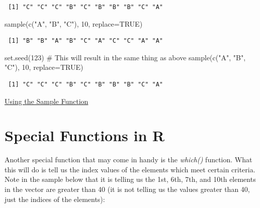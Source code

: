 \documentclass[
  letterpaper,
  DIV=11,
  numbers=noendperiod]{scrreprt}
\newenvironment{Shaded}{\begin{snugshade}}{\end{snugshade}}
\newcommand{\AttributeTok}[1]{\textcolor[rgb]{0.40,0.45,0.13}{#1}}
\newcommand{\CommentTok}[1]{\textcolor[rgb]{0.37,0.37,0.37}{#1}}
\newcommand{\ConstantTok}[1]{\textcolor[rgb]{0.56,0.35,0.01}{#1}}
\newcommand{\DecValTok}[1]{\textcolor[rgb]{0.68,0.00,0.00}{#1}}
\newcommand{\FunctionTok}[1]{\textcolor[rgb]{0.28,0.35,0.67}{#1}}
\newcommand{\NormalTok}[1]{\textcolor[rgb]{0.00,0.23,0.31}{#1}}
\newcommand{\StringTok}[1]{\textcolor[rgb]{0.13,0.47,0.30}{#1}}
\begin{document}
\begin{verbatim}
 [1] "C" "C" "C" "B" "C" "B" "B" "B" "C" "A"
\end{verbatim}

\begin{Shaded}
\begin{Highlighting}[]
\FunctionTok{sample}\NormalTok{(}\FunctionTok{c}\NormalTok{(}\StringTok{"A"}\NormalTok{, }\StringTok{"B"}\NormalTok{, }\StringTok{"C"}\NormalTok{), }\DecValTok{10}\NormalTok{, }\AttributeTok{replace=}\ConstantTok{TRUE}\NormalTok{)}
\end{Highlighting}
\end{Shaded}

\begin{verbatim}
 [1] "B" "B" "A" "B" "C" "A" "C" "C" "A" "A"
\end{verbatim}

\begin{Shaded}
\begin{Highlighting}[]
\FunctionTok{set.seed}\NormalTok{(}\DecValTok{123}\NormalTok{) }\CommentTok{\# This will result in the same thing as above}
\FunctionTok{sample}\NormalTok{(}\FunctionTok{c}\NormalTok{(}\StringTok{"A"}\NormalTok{, }\StringTok{"B"}\NormalTok{, }\StringTok{"C"}\NormalTok{), }\DecValTok{10}\NormalTok{, }\AttributeTok{replace=}\ConstantTok{TRUE}\NormalTok{)}
\end{Highlighting}
\end{Shaded}

\begin{verbatim}
 [1] "C" "C" "C" "B" "C" "B" "B" "B" "C" "A"
\end{verbatim}

\begin{watch}{}{}
    \href{https://youtu.be/8JwzbwIki-g}{Using the Sample Function}
\end{watch}

\section{Special Functions in R}\label{special-functions-in-r}

Another special function that may come in handy is the \emph{which()}
function. What this will do is tell us the index values of the elements
which meet certain criteria. Note in the sample below that it is telling
us the 1st, 6th, 7th, and 10th elements in the vector are greater than
40 (it is not telling us the values greater than 40, just the indices of
the elements):
\end{document}
